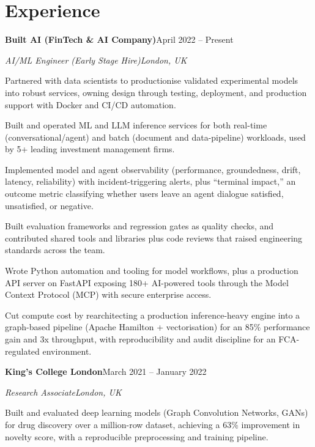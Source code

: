 \documentclass[10pt,a4paper]{article}
\newcommand{\entry}[4]{%
  {\color{company}\bfseries #1}\hfill {\color{muted}#2}\par
  \vspace{1pt}
  {\itshape #3}\hfill {\color{muted}\itshape #4}\par
  \vspace{3pt}%
}
\begin{document}
\section{Experience}
\entry{Built AI (FinTech \& AI Company)}{April 2022 -- Present}{AI/ML Engineer (Early Stage Hire)}{London, UK}
\begin{tight}
  \item Partnered with data scientists to productionise validated experimental models into robust services, owning design through testing, deployment, and production support with Docker and CI/CD automation.
  \item Built and operated ML and LLM inference services for both real-time (conversational/agent) and batch (document and data-pipeline) workloads, used by 5+ leading investment management firms.
  \item Implemented model and agent observability (performance, groundedness, drift, latency, reliability) with incident-triggering alerts, plus ``terminal impact,'' an outcome metric classifying whether users leave an agent dialogue satisfied, unsatisfied, or negative.
  \item Built evaluation frameworks and regression gates as quality checks, and contributed shared tools and libraries plus code reviews that raised engineering standards across the team.
  \item Wrote Python automation and tooling for model workflows, plus a production API server on FastAPI exposing 180+ AI-powered tools through the Model Context Protocol (MCP) with secure enterprise access.
  \item Cut compute cost by rearchitecting a production inference-heavy engine into a graph-based pipeline (Apache Hamilton + vectorisation) for an 85\% performance gain and 3x throughput, with reproducibility and audit discipline for an FCA-regulated environment.
\end{tight}

\entry{King's College London}{March 2021 -- January 2022}{Research Associate}{London, UK}
\begin{tight}
  \item Built and evaluated deep learning models (Graph Convolution Networks, GANs) for drug discovery over a million-row dataset, achieving a 63\% improvement in novelty score, with a reproducible preprocessing and training pipeline.
\end{tight}

\end{document}
